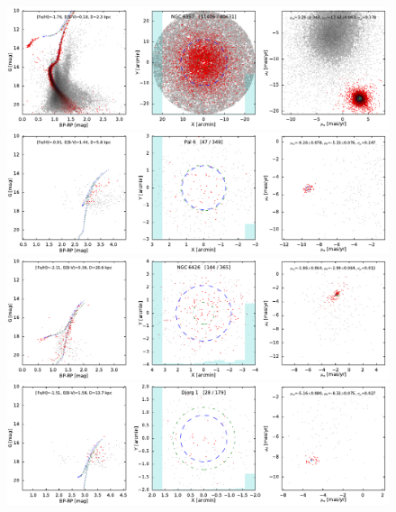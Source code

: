 \documentclass[usenatbib]{mnras}
\begin{document}
\clearpage\begin{figure}
\contcaption{}
\includegraphics{figs/NGC_6397.pdf}
\includegraphics{figs/Pal_6.pdf}
\includegraphics{figs/NGC_6426.pdf}
\includegraphics{figs/Djorg_1.pdf}
\end{figure}
\end{document}
